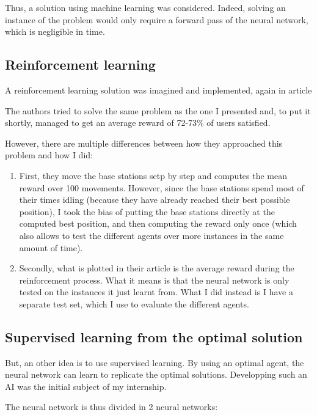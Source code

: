 \documentclass[letterpaper]{article}
\begin{document}
Thus, a solution using machine learning was considered.
Indeed, solving an instance of the problem would only require a forward pass of the neural network, which is negligible in time.

\subsection{Reinforcement learning}
\label{reinforcement}

A reinforcement learning solution was imagined and implemented, again in article\;\cite{main_article}

The authors tried to solve the same problem as the one I presented and, to put it shortly, managed to get an average reward of 72-73\% of users satisfied.

However, there are multiple differences between how they approached this problem and how I did:

\begin{enumerate}
    \item First, they move the base stations setp by step and computes the mean reward over 100 movements.
          However, since the base stations spend most of their times idling (because they have already reached their best possible position),
          I took the bias of putting the base stations directly at the computed best position, and then computing the reward only once (which also allows to test the different agents over more instances in the same amount of time).
    \item Secondly, what is plotted in their article is the average reward during the reinforcement process.
          What it means is that the neural network is only tested on the instances it just learnt from.
          What I did instead is I have a separate test set, which I use to evaluate the different agents.
\end{enumerate}

\subsection{Supervised learning from the optimal solution}

But, an other idea is to use supervised learning.
By using an optimal agent, the neural network can learn to replicate the optimal solutions.
Developping such an AI was the initial subject of my internship.

The neural network is thus divided in 2 neural networks:
\end{document}
